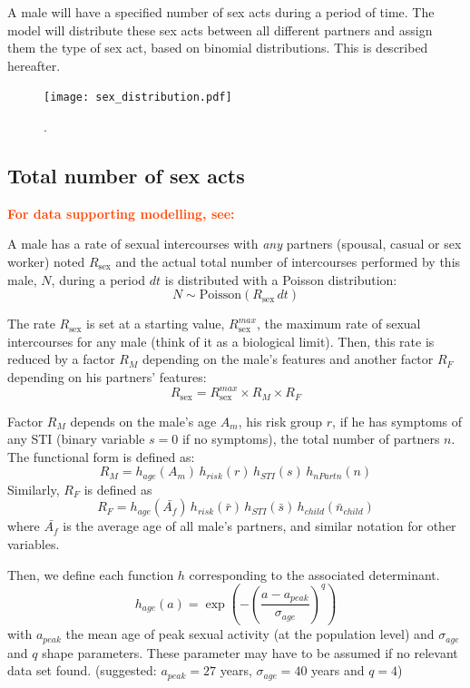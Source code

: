 \documentclass[11pt, onecolumn]{article}
\newcommand{\warning}[1]{\textbf{\textcolor{OrangeRed}{#1}}}
\begin{document}
A male will have a specified number of sex acts during a period of time. The model will distribute these sex acts between all different partners and assign them the type of sex act, based on binomial distributions. This is described hereafter.

\begin{figure}[ht]
\centering
    \texttt{[image: sex\_distribution.pdf]}
\caption{.}
\label{fig:sexDistribution}
\end{figure}


\subsection{Total number of sex acts}

\warning{For data supporting modelling, see:\cite{BREWIS:2005gk}}

A male has a rate of sexual intercourses with \emph{any} partners (spousal, casual or sex worker) noted $R_{\mathrm{sex}}$ and the actual total number of intercourses performed by this male, $N$, during a period $dt$ is distributed with a Poisson distribution: 
$$N\sim \mathrm{Poisson}(R_{\mathrm{sex}}\, dt)$$

The rate $R_{\mathrm{sex}}$ is set at a starting value,  $R_{\mathrm{sex}}^{max}$, the maximum rate of sexual intercourses for any male (think of it as a biological limit). Then, this rate is reduced by a factor $R_M$ depending on the male's features  and another factor $R_F$ depending on his partners' features:
$$R_{\mathrm{sex}} = R_{\mathrm{sex}}^{max} \times R_{M} \times R_{F} $$

Factor $R_M$ depends on the male's age $A_m$, his risk group $r$, if he has symptoms of any STI (binary variable $s=0$ if no symptoms), the total number of partners $n$. The functional form is defined as:
$$R_M= h_{age}(A_m)  \, h_{risk}(r)  \,h_{STI}(s) \,h_{nPartn}(n) $$
Similarly, $R_F$ is defined as
$$R_F=  h_{age}(\bar{A_f})  \, h_{risk}(\bar{r})  \,h_{STI}(\bar{s}) \,h_{child}(\bar{n}_{child})$$
where $\bar{A_f}$ is the average age of all male's partners, and similar notation for other variables.

Then, we define each function $h$ corresponding to the associated determinant.
$$h_{age}(a) = \exp \left(-\left(\frac{a-a_{peak}}{\sigma_{age}}\right)^q \right)$$
with $a_{peak}$ the mean age of peak sexual activity (at the population level) and $\sigma_{age}$ and $q$ shape parameters. These parameter may have to be assumed if no relevant data set found. (suggested: $a_{peak}=27$ years, $\sigma_{age}=40$ years and $q=4$) 
\end{document}
